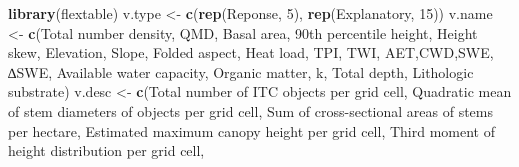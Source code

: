 \documentclass[
  12pt,
]{article}
\newenvironment{Shaded}{\begin{snugshade}}{\end{snugshade}}
\newcommand{\DecValTok}[1]{\textcolor[rgb]{0.00,0.00,0.81}{#1}}
\newcommand{\FunctionTok}[1]{\textcolor[rgb]{0.13,0.29,0.53}{\textbf{#1}}}
\newcommand{\NormalTok}[1]{#1}
\newcommand{\OtherTok}[1]{\textcolor[rgb]{0.56,0.35,0.01}{#1}}
\newcommand{\StringTok}[1]{\textcolor[rgb]{0.31,0.60,0.02}{#1}}
\begin{document}
\begin{Shaded}
\begin{Highlighting}[]
\FunctionTok{library}\NormalTok{(flextable)}
\NormalTok{v.type }\OtherTok{\textless{}{-}} \FunctionTok{c}\NormalTok{(}\FunctionTok{rep}\NormalTok{(}\StringTok{\textquotesingle{}Reponse\textquotesingle{}}\NormalTok{, }\DecValTok{5}\NormalTok{), }\FunctionTok{rep}\NormalTok{(}\StringTok{\textquotesingle{}Explanatory\textquotesingle{}}\NormalTok{, }\DecValTok{15}\NormalTok{))}
\NormalTok{v.name }\OtherTok{\textless{}{-}} \FunctionTok{c}\NormalTok{(}\StringTok{\textquotesingle{}Total number density\textquotesingle{}}\NormalTok{, }\StringTok{\textquotesingle{}QMD\textquotesingle{}}\NormalTok{, }
            \StringTok{\textquotesingle{}Basal area\textquotesingle{}}\NormalTok{, }\StringTok{\textquotesingle{}90th percentile height\textquotesingle{}}\NormalTok{, }\StringTok{\textquotesingle{}Height skew\textquotesingle{}}\NormalTok{, }\StringTok{\textquotesingle{}Elevation\textquotesingle{}}\NormalTok{,}
            \StringTok{\textquotesingle{}Slope\textquotesingle{}}\NormalTok{, }\StringTok{\textquotesingle{}Folded aspect\textquotesingle{}}\NormalTok{, }\StringTok{\textquotesingle{}Heat load\textquotesingle{}}\NormalTok{, }\StringTok{\textquotesingle{}TPI\textquotesingle{}}\NormalTok{, }\StringTok{\textquotesingle{}TWI\textquotesingle{}}\NormalTok{, }
            \StringTok{\textquotesingle{}AET\textquotesingle{}}\NormalTok{,}\StringTok{\textquotesingle{}CWD\textquotesingle{}}\NormalTok{,}\StringTok{\textquotesingle{}SWE\textquotesingle{}}\NormalTok{, }\StringTok{\textquotesingle{}∆SWE\textquotesingle{}}\NormalTok{, }\StringTok{\textquotesingle{}Available water capacity\textquotesingle{}}\NormalTok{, }
            \StringTok{\textquotesingle{}Organic matter\textquotesingle{}}\NormalTok{, }\StringTok{\textquotesingle{}k\textquotesingle{}}\NormalTok{, }\StringTok{\textquotesingle{}Total depth\textquotesingle{}}\NormalTok{, }\StringTok{\textquotesingle{}Lithologic substrate\textquotesingle{}}\NormalTok{)}
\NormalTok{v.desc }\OtherTok{\textless{}{-}} \FunctionTok{c}\NormalTok{(}\StringTok{\textquotesingle{}Total number of ITC objects per grid cell\textquotesingle{}}\NormalTok{,}
            \StringTok{\textquotesingle{}Quadratic mean of stem diameters of objects per grid cell\textquotesingle{}}\NormalTok{,}
            \StringTok{\textquotesingle{}Sum of cross{-}sectional areas of stems per hectare\textquotesingle{}}\NormalTok{,}
            \StringTok{\textquotesingle{}Estimated maximum canopy height per grid cell\textquotesingle{}}\NormalTok{,}
            \StringTok{\textquotesingle{}Third moment of height distribution per grid cell\textquotesingle{}}\NormalTok{,}

\end{Highlighting}
\end{Shaded}
\end{document}
